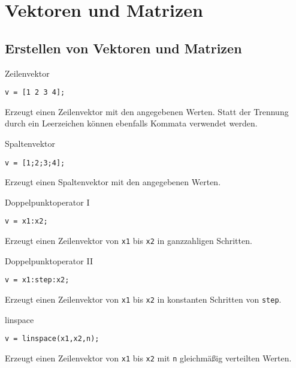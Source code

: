 \section{Vektoren und Matrizen}
        \subsection{Erstellen von Vektoren und Matrizen}
        \begin{CodeErklaerungBox}{Zeilenvektor}
                \begin{lstlisting}
v = [1 2 3 4];
                \end{lstlisting}
                \tcblower
                Erzeugt einen Zeilenvektor mit den angegebenen Werten. Statt der Trennung durch ein Leerzeichen können ebenfalls Kommata verwendet werden.
                \end{CodeErklaerungBox}
                \begin{CodeErklaerungBox}{Spaltenvektor}
                \begin{lstlisting}
v = [1;2;3;4];
                \end{lstlisting}
                \tcblower
                Erzeugt einen Spaltenvektor mit den angegebenen Werten.
            \end{CodeErklaerungBox}
            \begin{CodeErklaerungBox}{Doppelpunktoperator I}
                \begin{lstlisting}
v = x1:x2;
                \end{lstlisting}
                \tcblower
                Erzeugt einen Zeilenvektor von \texttt{x1} bis \texttt{x2} in ganzzahligen Schritten.
            \end{CodeErklaerungBox}
            \begin{CodeErklaerungBox}{Doppelpunktoperator II}
                \begin{lstlisting}
v = x1:step:x2;
                \end{lstlisting}
                \tcblower
                Erzeugt einen Zeilenvektor von \texttt{x1} bis \texttt{x2} in konstanten Schritten von \texttt{step}.
            \end{CodeErklaerungBox}
            \begin{CodeErklaerungBox}{linspace}
                \begin{lstlisting}
v = linspace(x1,x2,n);
                \end{lstlisting}
                \tcblower
                Erzeugt einen Zeilenvektor von \texttt{x1} bis \texttt{x2} mit \texttt{n} gleichmäßig verteilten Werten.
            \end{CodeErklaerungBox}
